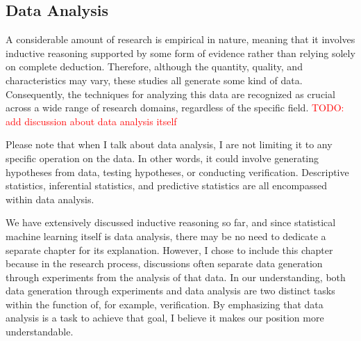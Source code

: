 \documentclass{article}
\begin{document}


\subsection{Data Analysis}
A considerable amount of research is empirical in nature, meaning that it involves inductive reasoning supported by some form of evidence rather than relying solely on complete deduction. Therefore, although the quantity, quality, and characteristics may vary, these studies all generate some kind of data. Consequently, the techniques for analyzing this data are recognized as crucial across a wide range of research domains, regardless of the specific field. \textcolor{red}{TODO: add discussion about data analysis itself}

Please note that when I talk about data analysis, I are not limiting it to any specific operation on the data. In other words, it could involve generating hypotheses from data, testing hypotheses, or conducting verification. Descriptive statistics, inferential statistics, and predictive statistics are all encompassed within data analysis.

We have extensively discussed inductive reasoning so far, and since statistical machine learning itself is data analysis, there may be no need to dedicate a separate chapter for its explanation. However, I chose to include this chapter because in the research process, discussions often separate data generation through experiments from the analysis of that data. In our understanding, both data generation through experiments and data analysis are two distinct tasks within the function of, for example, verification. By emphasizing that data analysis is a task to achieve that goal, I believe it makes our position more understandable. 
\end{document}
